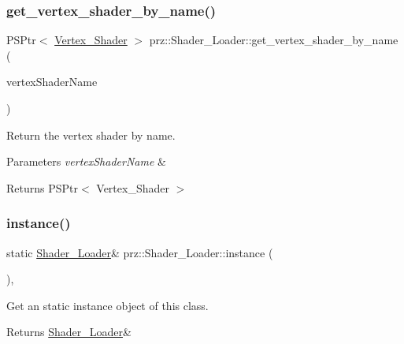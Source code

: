 \subsubsection{\texorpdfstring{get\_vertex\_shader\_by\_name()}{get\_vertex\_shader\_by\_name()}}
{\footnotesize\ttfamily P\+S\+Ptr$<$ \mbox{\hyperlink{classprz_1_1_vertex___shader}{Vertex\+\_\+\+Shader}} $>$ prz\+::\+Shader\+\_\+\+Loader\+::get\+\_\+vertex\+\_\+shader\+\_\+by\+\_\+name (\begin{DoxyParamCaption}\item[{const P\+String \&}]{vertex\+Shader\+Name }\end{DoxyParamCaption})\hspace{0.3cm}{\ttfamily [inline]}}



Return the vertex shader by name. 


\begin{DoxyParams}{Parameters}
{\em vertex\+Shader\+Name} & \\
\hline
\end{DoxyParams}
\begin{DoxyReturn}{Returns}
P\+S\+Ptr$<$ Vertex\+\_\+\+Shader $>$ 
\end{DoxyReturn}
\mbox{\label{classprz_1_1_shader___loader_adf553c01cabfb79286fa777e8d064b39}} 
\subsubsection{\texorpdfstring{instance()}{instance()}}
{\footnotesize\ttfamily static \mbox{\hyperlink{classprz_1_1_shader___loader}{Shader\+\_\+\+Loader}}\& prz\+::\+Shader\+\_\+\+Loader\+::instance (\begin{DoxyParamCaption}{ }\end{DoxyParamCaption})\hspace{0.3cm}{\ttfamily [inline]}, {\ttfamily [static]}}



Get an static instance object of this class. 

\begin{DoxyReturn}{Returns}
\mbox{\hyperlink{classprz_1_1_shader___loader}{Shader\+\_\+\+Loader}}\& 
\end{DoxyReturn}
\mbox{\label{classprz_1_1_shader___loader_ac70cb86a50808ced5b668a46f5d010fc}} 

